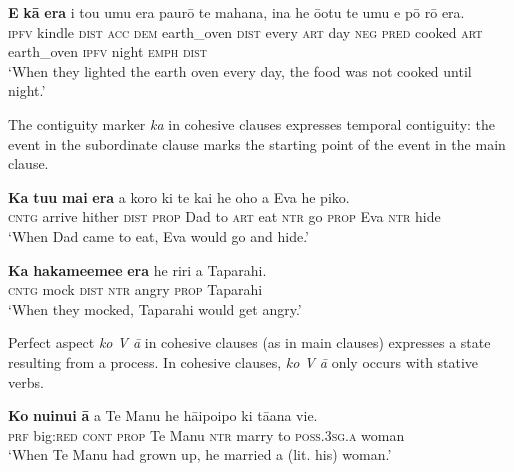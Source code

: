 \ea\label{ex:11.214}
\gll \textbf{E} \textbf{kā} \textbf{era} i tou {\ꞌ}umu era paurō te mahana,  {\ꞌ}ina he {\ꞌ}ō{\ꞌ}otu te {\ꞌ}umu e pō rō era.\\
\textsc{ipfv} kindle \textsc{dist} \textsc{acc} \textsc{dem} earth\_oven \textsc{dist} every \textsc{art} day  \textsc{neg} \textsc{pred} cooked \textsc{art} earth\_oven \textsc{ipfv} night \textsc{emph} \textsc{dist}\\

\glt 
‘When they lighted the earth oven every day, the food was not cooked until night.’ \textstyleExampleref{[R352.013]} 
\z

The contiguity marker \textit{ka} in cohesive clauses expresses temporal contiguity: the event in the subordinate clause marks the starting point of the event in the main clause.

\ea\label{ex:11.215}
\gll \textbf{Ka} \textbf{tu{\ꞌ}u} \textbf{mai} \textbf{era} a koro ki te kai he oho a Eva he piko. \\
\textsc{cntg} arrive hither \textsc{dist} \textsc{prop} Dad to \textsc{art} eat \textsc{ntr} go \textsc{prop} Eva \textsc{ntr} hide \\

\glt 
‘When Dad came to eat, Eva would go and hide.’ \textstyleExampleref{[R210.026]} 
\z

\ea\label{ex:11.216}
\gll \textbf{Ka} \textbf{hakame{\ꞌ}eme{\ꞌ}e} \textbf{era} he riri a Taparahi. \\
\textsc{cntg} mock \textsc{dist} \textsc{ntr} angry \textsc{prop} Taparahi \\

\glt 
‘When they mocked, Taparahi would get angry.’ \textstyleExampleref{[R250.151]} 
\z

Perfect aspect \textit{ko V {\ꞌ}ā} in cohesive clauses (as in main clauses) expresses a state resulting from a process. In cohesive clauses, \textit{ko V {\ꞌ}ā} only occurs with stative verbs.

\ea\label{ex:11.217}
\gll \textbf{Ko} \textbf{nuinui} \textbf{{\ꞌ}ā} a Te Manu he hāipoipo ki tā{\ꞌ}ana vi{\ꞌ}e.\\
\textsc{prf} big:\textsc{red} \textsc{cont} \textsc{prop} Te Manu \textsc{ntr} marry to \textsc{poss.3sg.a} woman\\

\glt 
‘When Te Manu had grown up, he married a (lit. his) woman.’ \textstyleExampleref{[R245.256]} 
\z

